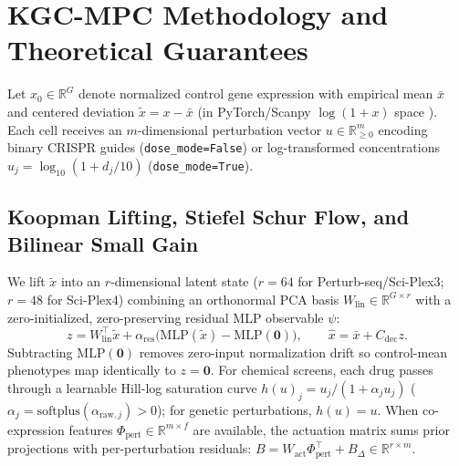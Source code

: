 \documentclass[journal]{IEEEtran}
\begin{document}
\section{KGC-MPC Methodology and Theoretical Guarantees}

Let $x_0 \in \mathbb{R}^G$ denote normalized control gene expression with empirical mean $\bar{x}$ and centered deviation $\tilde{x} = x - \bar{x}$ (in PyTorch/Scanpy $\log(1+x)$ space \cite{paszke2019pytorch,wolf2018scanpy}). Each cell receives an $m$-dimensional perturbation vector $u \in \mathbb{R}^m_{\ge 0}$ encoding binary CRISPR guides (\texttt{dose\_\allowbreak mode=False}) or log-transformed concentrations $u_j = \log_{10}(1 + d_j/10)$ (\texttt{dose\_\allowbreak mode=True}).

\subsection{Koopman Lifting, Stiefel Schur Flow, and Bilinear Small Gain}
We lift $\tilde{x}$ into an $r$-dimensional latent state ($r=64$ for Perturb-seq/Sci-Plex3; $r=48$ for Sci-Plex4) combining an orthonormal PCA basis $W_{\mathrm{lin}} \in \mathbb{R}^{G\times r}$ with a zero-initialized, zero-preserving residual MLP observable $\psi$:
\begin{equation}
  z = W_{\mathrm{lin}}^\top \tilde{x} + \alpha_{\mathrm{res}}\big(\mathrm{MLP}(\tilde{x}) - \mathrm{MLP}(\mathbf{0})\big), \qquad \hat{x} = \bar{x} + C_{\mathrm{dec}} z.
  \label{eq:lift}
\end{equation}
Subtracting $\mathrm{MLP}(\mathbf{0})$ removes zero-input normalization drift so control-mean phenotypes map identically to $z=\mathbf{0}$. For chemical screens, each drug passes through a learnable Hill-log saturation curve $h(u)_j = u_j / (1 + \alpha_j u_j)$ ($\alpha_j = \mathrm{softplus}(\alpha_{\mathrm{raw},j}) > 0$); for genetic perturbations, $h(u)=u$. When co-expression features $\Phi_{\mathrm{pert}} \in \mathbb{R}^{m \times f}$ are available, the actuation matrix sums prior projections with per-perturbation residuals: $B = W_{\mathrm{act}}\Phi_{\mathrm{pert}}^\top + B_\Delta \in \mathbb{R}^{r \times m}$.
\end{document}
